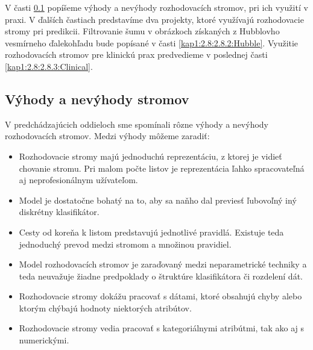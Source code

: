 V časti \ref{kap1:2.8:2.8.1:AdvAndDis} popíšeme výhody a nevýhody rozhodovacích stromov, pri ich využití v praxi. V ďalších častiach predstavíme dva projekty, ktoré využívajú rozhodovacie stromy pri predikcii. Filtrovanie šumu v obrázkoch získaných z Hubblovho vesmírneho ďalekohľadu bude popísané v časti \ref{kap1:2.8:2.8.2:Hubble}. Využitie rozhodovacích stromov pre klinickú prax predvedieme v poslednej časti \ref{kap1:2.8:2.8.3:Clinical}.

\subsection{Výhody a nevýhody stromov}\label{kap1:2.8:2.8.1:AdvAndDis}
V predchádzajúcich oddieloch sme spomínali rôzne výhody a nevýhody rozhodovacích stromov. Medzi výhody môžeme zaradiť:
\begin{itemize}
\item Rozhodovacie stromy majú jednoduchú reprezentáciu, z ktorej je vidieť chovanie stromu. Pri malom počte listov je reprezentácia ľahko spracovateľná aj neprofesionálnym užívateľom.
\item Model je dostatočne bohatý na to, aby sa naňho dal previesť ľubovoľný iný diskrétny klasifikátor.
\item Cesty od koreňa k listom predstavujú jednotlivé pravidlá. Existuje teda jednoduchý prevod medzi stromom a množinou pravidiel.
\item Model rozhodovacích stromov je zaraďovaný medzi neparametrické techniky a teda neuvažuje žiadne predpoklady o štruktúre klasifikátora či rozdelení dát.
\item Rozhodovacie stromy dokážu pracovať s dátami, ktoré obsahujú chyby alebo ktorým chýbajú hodnoty niektorých atribútov.
\item Rozhodovacie stromy vedia pracovať s kategoriálnymi atribútmi, tak ako aj s numerickými.
\end{itemize}

